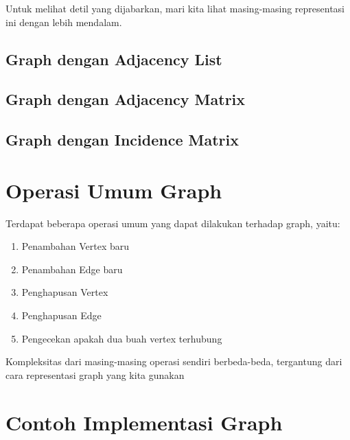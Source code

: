 Untuk melihat detil yang dijabarkan, mari kita lihat masing-masing representasi ini dengan lebih mendalam.

\subsection{Graph dengan Adjacency List}

\subsection{Graph dengan Adjacency Matrix}

\subsection{Graph dengan Incidence Matrix}

\section{Operasi Umum Graph}

Terdapat beberapa operasi umum yang dapat dilakukan terhadap graph, yaitu:

\begin{enumerate}
    \item Penambahan Vertex baru
    \item Penambahan Edge baru
    \item Penghapusan Vertex
    \item Penghapusan Edge
    \item Pengecekan apakah dua buah vertex terhubung
\end{enumerate}

Kompleksitas dari masing-masing operasi sendiri berbeda-beda, tergantung dari cara representasi graph yang kita gunakan

\section{Contoh Implementasi Graph}

